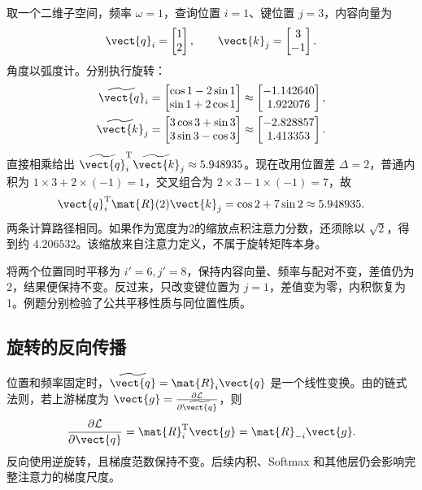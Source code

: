 \documentclass[../textbook.tex]{subfiles}
\begin{document}
\begin{example}
取一个二维子空间，频率 $\omega=1$，查询位置 $i=1$、键位置 $j=3$，内容向量为
\begin{equation*}
 \vect{q}_i=\begin{bmatrix}1\\2\end{bmatrix},\qquad
 \vect{k}_j=\begin{bmatrix}3\\-1\end{bmatrix}.
\end{equation*}
角度以弧度计。分别执行旋转：
\begin{align*}
 \widetilde{\vect{q}}_i
 &=\begin{bmatrix}\cos1-2\sin1\\\sin1+2\cos1\end{bmatrix}
 \approx\begin{bmatrix}-1.142640\\1.922076\end{bmatrix},\\
 \widetilde{\vect{k}}_j
 &=\begin{bmatrix}3\cos3+\sin3\\3\sin3-\cos3\end{bmatrix}
 \approx\begin{bmatrix}-2.828857\\1.413353\end{bmatrix}.
\end{align*}
直接相乘给出 $\widetilde{\vect{q}}_i^{\mathrm{T}}\widetilde{\vect{k}}_j\approx5.948935$。现在改用位置差 $\Delta=2$，普通内积为 $1\times3+2\times(-1)=1$，交叉组合为 $2\times3-1\times(-1)=7$，故
\begin{equation*}
 \vect{q}_i^{\mathrm{T}}\mat{R}(2)\vect{k}_j=\cos2+7\sin2\approx5.948935.
\end{equation*}
两条计算路径相同。如果作为宽度为2的缩放点积注意力分数，还须除以 $\sqrt2$，得到约 $4.206532$。该缩放来自注意力定义，不属于旋转矩阵本身。

将两个位置同时平移为 $i'=6,j'=8$，保持内容向量、频率与配对不变，差值仍为2，结果便保持不变。反过来，只改变键位置为 $j=1$，差值变为零，内积恢复为1。例题分别检验了公共平移性质与同位置性质。
\end{example}

\subsection{旋转的反向传播}
位置和频率固定时，$\widetilde{\vect{q}}=\mat{R}_i\vect{q}$ 是一个线性变换。由的链式法则，若上游梯度为 $\vect{g}=\frac{\partial\mathcal L}{\partial\widetilde{\vect{q}}}$，则
\begin{equation}
 \frac{\partial\mathcal L}{\partial \vect{q}}=\mat{R}_i^{\mathrm{T}}\vect{g}=\mat{R}_{-i}\vect{g}.
\end{equation}
反向使用逆旋转，且梯度范数保持不变。后续内积、Softmax 和其他层仍会影响完整注意力的梯度尺度。
\end{document}
